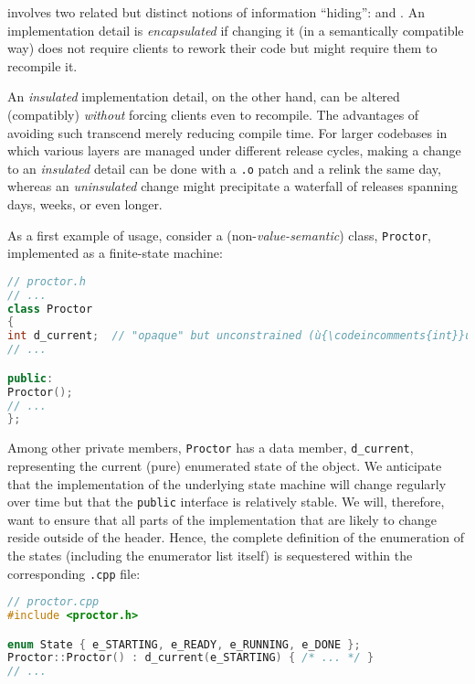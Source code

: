  involves two related but distinct notions of
information ``hiding'':  and .
An implementation detail is \emph{encapsulated} if changing it (in a
semantically compatible way) does not require clients to rework their
code but might require them to recompile it.

An \emph{insulated} implementation detail, on the other hand, can be
altered (compatibly) \emph{without} forcing clients even to recompile.
The advantages of avoiding such  transcend
merely reducing compile time. For larger codebases in which various
layers are managed under different release cycles, making a change to an
\emph{insulated} detail can be done with a \lstinline!.o! patch and a
relink the same day, whereas an \emph{uninsulated} change might
precipitate a waterfall of releases spanning days, weeks, or even
longer.

As a first example of  usage, consider a
(non-\emph{value-semantic})  class, \lstinline!Proctor!,
implemented as a finite-state machine:

\begin{lstlisting}[language=C++]
// proctor.h
// ...
class Proctor
{
int d_current;  // "opaque" but unconstrained (ù{\codeincomments{int}}ù) type (BAD IDEA)
// ...

public:
Proctor();
// ...
};
\end{lstlisting}

\noindent Among other private members, \lstinline!Proctor! has a data member,
\lstinline!d_current!, representing the current (pure) enumerated state of
the object. We anticipate that the implementation of the underlying
state machine will change regularly over time but that the
\lstinline!public! interface is relatively stable. We will, therefore, want
to ensure that all parts of the implementation that are likely to change
reside outside of the header. Hence, the complete definition of the
enumeration of the states (including the enumerator list itself) is
sequestered within the corresponding \lstinline!.cpp! file:

\begin{lstlisting}[language=C++]
// proctor.cpp
#include <proctor.h>

enum State { e_STARTING, e_READY, e_RUNNING, e_DONE };
Proctor::Proctor() : d_current(e_STARTING) { /* ... */ }
// ...
\end{lstlisting}

